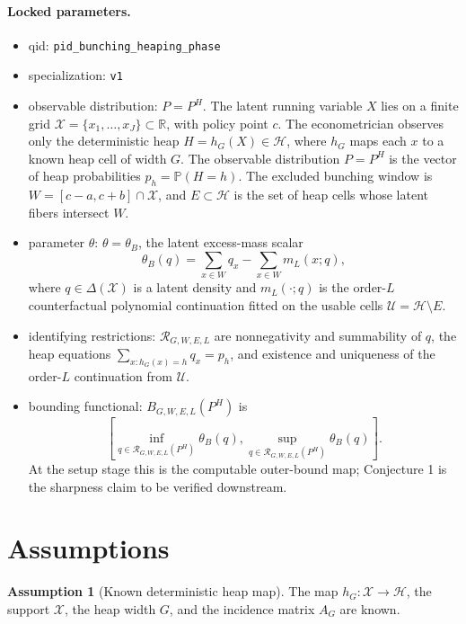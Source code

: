 \documentclass[11pt]{article}
\renewcommand{\Pr}{\mathbb{P}}
\theoremstyle{definition}
\newtheorem{assumption}{Assumption}
\theoremstyle{plain}
\theoremstyle{remark}
\begin{document}
\paragraph{Locked parameters.}
\begin{itemize}[leftmargin=*]
  \item qid: \texttt{pid\_bunching\_heaping\_phase}
  \item specialization: \texttt{v1}
  \item observable distribution: \(P=P^H\).  The latent running variable \(X\) lies on a finite grid \(\mathcal{X}=\{x_1,\ldots,x_J\}\subset\mathbb{R}\), with policy point \(c\).  The econometrician observes only the deterministic heap \(H=h_G(X)\in\mathcal{H}\), where \(h_G\) maps each \(x\) to a known heap cell of width \(G\).  The observable distribution \(P=P^H\) is the vector of heap probabilities \(p_h=\Pr(H=h)\).  The excluded bunching window is \(W=[c-a,c+b]\cap\mathcal{X}\), and \(E\subset\mathcal{H}\) is the set of heap cells whose latent fibers intersect \(W\).
  \item parameter \(\theta\): \(\theta=\theta_B\), the latent excess-mass scalar
  \[
  \theta_B(q)=\sum_{x\in W} q_x-\sum_{x\in W} m_L(x;q),
  \]
  where \(q\in\Delta(\mathcal{X})\) is a latent density and \(m_L(\cdot;q)\) is the order-\(L\) counterfactual polynomial continuation fitted on the usable cells \(\mathcal{U}=\mathcal{H}\setminus E\).
  \item identifying restrictions: \(\mathcal{R}_{G,W,E,L}\) are nonnegativity and summability of \(q\), the heap equations \(\sum_{x:h_G(x)=h}q_x=p_h\), and existence and uniqueness of the order-\(L\) continuation from \(\mathcal{U}\).
  \item bounding functional: \(B_{G,W,E,L}(P^H)\) is
  \[
  \left[
  \inf_{q\in\mathcal{R}_{G,W,E,L}(P^H)}\theta_B(q),
  \sup_{q\in\mathcal{R}_{G,W,E,L}(P^H)}\theta_B(q)
  \right].
  \]
  At the setup stage this is the computable outer-bound map; Conjecture 1 is the sharpness claim to be verified downstream.
\end{itemize}

\section{Assumptions}
\begin{assumption}[Known deterministic heap map]\label{ass:heap}
The map \(h_G:\mathcal{X}\to\mathcal{H}\), the support \(\mathcal{X}\), the heap width \(G\), and the incidence matrix \(A_G\) are known.
\end{assumption}
\end{document}
